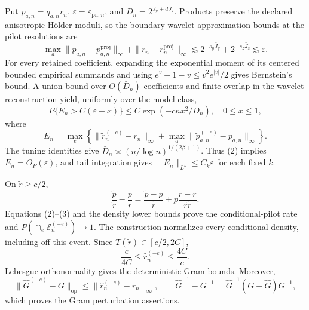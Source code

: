 Put \(p_{a,n}=q_{a,n}r_n\), \(\varepsilon=\varepsilon_{\mathrm{pil},n}\), and \(\bar D_n=2^{\bar J_y+d\bar J_z}\). Products preserve the declared anisotropic H\"older moduli, so the boundary-wavelet approximation bounds at the pilot resolutions are
\[
\max_a\|p_{a,n}-p_{a,n}^{\mathrm{proj}}\|_\infty
+\|r_n-r_n^{\mathrm{proj}}\|_\infty
\lesssim2^{-s_y\bar J_y}+2^{-s_z\bar J_z}\lesssim\varepsilon.   \tag{1}
\]
For every retained coefficient, expanding the exponential moment of its centered bounded empirical summands and using \(e^v-1-v\le v^2e^{|v|}/2\) gives Bernstein's bound. A union bound over \(O(\bar D_n)\) coefficients and finite overlap in the wavelet reconstruction yield, uniformly over the model class,
\[
P\{E_n>C(\varepsilon+x)\}\le C\exp(-cnx^2/\bar D_n),
\quad 0\le x\le1,                                                \tag{2}
\]
where
\[
E_n=\max_e\left\{\|\widetilde r_n^{(-e)}-r_n\|_\infty
+\max_a\|\widetilde p_{a,n}^{(-e)}-p_{a,n}\|_\infty\right\}.
\]
The tuning identities give \(\bar D_n\asymp(n/\log n)^{1/(2\beta+1)}\). Thus (2) implies \(E_n=O_P(\varepsilon)\), and tail integration gives \(\|E_n\|_{L^k}\le C_k\varepsilon\) for each fixed \(k\).

On \(\widetilde r\ge c/2\),
\[
\frac{\widetilde p}{\widetilde r}-\frac pr
=\frac{\widetilde p-p}{\widetilde r}
+p\frac{r-\widetilde r}{r\widetilde r}.                          \tag{3}
\]
Equations (2)--(3) and the density lower bounds prove the conditional-pilot rate and \(P(\cap_e\mathcal E_n^{(-e)})\to1\). The construction normalizes every conditional density, including off this event. Since \(T(\widetilde r)\in[c/2,2C]\),
\[
\frac c{4C}\le\widehat r_n^{(-e)}\le\frac{4C}{c}.              \tag{4}
\]
Lebesgue orthonormality gives the deterministic Gram bounds. Moreover,
\[
\|\widehat G^{(-e)}-G\|_{\mathrm{op}}
\le\|\widehat r_n^{(-e)}-r_n\|_\infty,
\qquad
\widehat G^{-1}-G^{-1}=\widehat G^{-1}(G-\widehat G)G^{-1},      \tag{5}
\]
which proves the Gram perturbation assertions.

